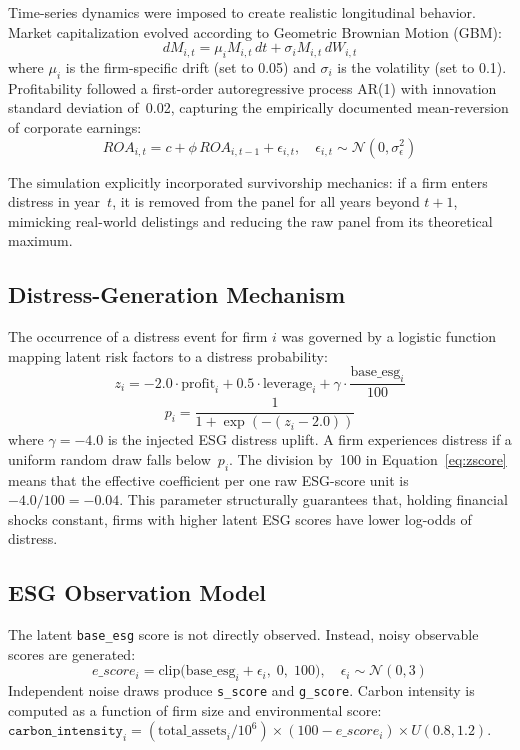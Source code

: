 \documentclass[sigconf,anonymous]{acmart}
\begin{document}
Time-series dynamics were imposed to create realistic longitudinal behavior. Market capitalization evolved according to Geometric Brownian Motion (GBM):
\begin{equation}
    dM_{i,t} = \mu_i M_{i,t} \, dt + \sigma_i M_{i,t} \, dW_{i,t}
\end{equation}
where $\mu_i$ is the firm-specific drift (set to 0.05) and $\sigma_i$ is the volatility (set to 0.1). Profitability followed a first-order autoregressive process AR(1) with innovation standard deviation of~0.02, capturing the empirically documented mean-reversion of corporate earnings:
\begin{equation}
    ROA_{i,t} = c + \phi \, ROA_{i,t-1} + \epsilon_{i,t}, \quad \epsilon_{i,t} \sim \mathcal{N}(0, \sigma_\epsilon^2)
\end{equation}

The simulation explicitly incorporated survivorship mechanics: if a firm enters distress in year~$t$, it is removed from the panel for all years beyond $t+1$, mimicking real-world delistings and reducing the raw panel from its theoretical maximum.

\subsection{Distress-Generation Mechanism}
The occurrence of a distress event for firm $i$ was governed by a logistic function mapping latent risk factors to a distress probability:
\begin{equation}
    z_i = -2.0 \cdot \text{profit}_i + 0.5 \cdot \text{leverage}_i + \gamma \cdot \frac{\text{base\_esg}_i}{100}
    \label{eq:zscore}
\end{equation}
\begin{equation}
    p_i = \frac{1}{1 + \exp(-(z_i - 2.0))}
    \label{eq:logistic}
\end{equation}
where $\gamma = -4.0$ is the injected ESG distress uplift. A firm experiences distress if a uniform random draw falls below~$p_i$. The division by~100 in Equation~\ref{eq:zscore} means that the effective coefficient per one raw ESG-score unit is $-4.0 / 100 = -0.04$. This parameter structurally guarantees that, holding financial shocks constant, firms with higher latent ESG scores have lower log-odds of distress.

\subsection{ESG Observation Model}
The latent \texttt{base\_esg} score is not directly observed. Instead, noisy observable scores are generated:
\begin{equation}
    e\_score_i = \text{clip}\bigl(\text{base\_esg}_i + \epsilon_i, \; 0, \; 100\bigr), \quad \epsilon_i \sim \mathcal{N}(0, 3)
    \label{eq:esg_obs}
\end{equation}
Independent noise draws produce \texttt{s\_score} and \texttt{g\_score}. Carbon intensity is computed as a function of firm size and environmental score: $\texttt{carbon\_intensity}_i = (\text{total\_assets}_i / 10^6) \times (100 - e\_score_i) \times U(0.8, 1.2)$.
\end{document}
